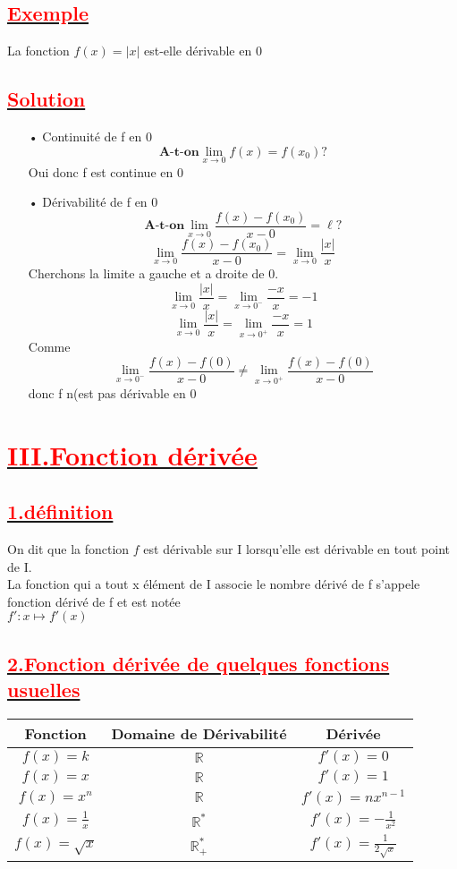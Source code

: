 \documentclass[12pt]{article}
\begin{document}
\subsection*{\underline{\textbf{\textcolor{red}{Exemple}}}}
La fonction $f(x)=|x|$ est-elle dérivable en $0$
\subsection*{\underline{\textbf{\textcolor{red}{Solution}}}}
\begin{itemize}
\item[•] Continuité de f en $0$\\
 \[\textbf{A-t-on}\lim_{x \to 0}f(x)=f(x_{0})?\]
 Oui donc f est continue en 0
 \item[•] Dérivabilité de f en $0$\\
 \[\textbf{A-t-on}\lim_{x \to 0}\frac{f(x)-f(x_{0})}{x-0}=\ell?\]
  \[\lim_{x \to 0}\frac{f(x)-f(x_{0})}{x-0}=\lim_{x \to 0}\frac{|x|}{x}\]
  Cherchons la limite a gauche et a droite de 0.
   \[\lim_{x \to 0}\frac{|x|}{x}=\lim_{x \to 0^{-}}\frac{-x}{x}=-1\]
     \[\lim_{x \to 0}\frac{|x|}{x}=\lim_{x \to 0^{+}}\frac{-x}{x}=1\]
     Comme \[\lim_{x \to 0^{-}}\frac{f(x)-f(0)}{x-0}\neq \lim_{x \to 0^{+}}\frac{f(x)-f(0)}{x-0}\] donc f n(est pas dérivable en 0
\end{itemize}
\section*{\underline{\textbf{\textcolor{red}{III.Fonction dérivée}}}}
\subsection*{\underline{\textbf{\textcolor{red}{1.définition}}}}
On dit que la fonction $f$ est dérivable sur I lorsqu'elle est dérivable en tout point de I.\\
La fonction qui a tout x élément de I associe le nombre dérivé de  f s'appele fonction dérivé de f et est notée\\
$f':x\mapsto f'(x)$
\subsection*{\underline{\textbf{\textcolor{red}{2.Fonction dérivée de quelques fonctions usuelles}}}}
\begin{center}
\begin{tabular}{|c|c|c|}
\hline
Fonction &Domaine de Dérivabilité &  Dérivée   \\
\hline
$f(x) = k$& $\mathbb{R}$ & $f'(x)=0$ \\
\hline
$f(x) = x$& $\mathbb{R}$ & $f'(x) = 1$ \\
\hline
$f(x) = x^{n}$& $\mathbb{R}$ & $f'(x) = nx^{n-1}$ \\
\hline
$f(x) = \frac{1}{x}$& $\mathbb{R}^{*}$ & $f'(x) = -\frac{1}{x^{2}}$ \\
\hline
$f(x) = \sqrt{x}$& $\mathbb{R}^{*}_{+}$ & $f'(x) = \frac{1}{2\sqrt{x}}$ \\
\hline
\end{tabular}
\end{center}
\end{document}
